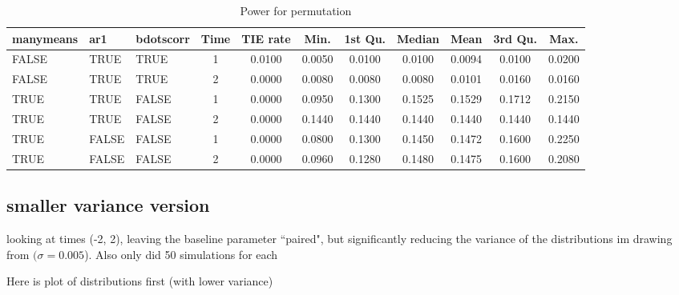 \documentclass{article}
\begin{document}
\begin{table}[H]
\centering
\begin{tabular}{lllcccccccc}
  \hline
manymeans & ar1 & bdotscorr & Time & TIE rate & Min. & 1st Qu. & Median & Mean & 3rd Qu. & Max. \\ 
  \hline
FALSE & TRUE & TRUE &     1 & 0.0100 & 0.0050 & 0.0100 & 0.0100 & 0.0094 & 0.0100 & 0.0200 \\ 
  FALSE & TRUE & TRUE &     2 & 0.0000 & 0.0080 & 0.0080 & 0.0080 & 0.0101 & 0.0160 & 0.0160 \\ 
  TRUE & TRUE & FALSE &     1 & 0.0000 & 0.0950 & 0.1300 & 0.1525 & 0.1529 & 0.1712 & 0.2150 \\ 
  TRUE & TRUE & FALSE &     2 & 0.0000 & 0.1440 & 0.1440 & 0.1440 & 0.1440 & 0.1440 & 0.1440 \\ 
  TRUE & FALSE & FALSE &     1 & 0.0000 & 0.0800 & 0.1300 & 0.1450 & 0.1472 & 0.1600 & 0.2250 \\ 
  TRUE & FALSE & FALSE &     2 & 0.0000 & 0.0960 & 0.1280 & 0.1480 & 0.1475 & 0.1600 & 0.2080 \\ 
   \hline
\end{tabular}
\caption{Power for permutation} 
\label{tab:perm_pwr}
\end{table}


\subsection{smaller variance version}

looking at times (-2, 2), leaving the baseline parameter ``paired", but significantly reducing the variance of the distributions im drawing from $(\sigma = 0.005$). Also only did 50 simulations for each

Here is plot of distributions first (with lower variance)
\end{document}
